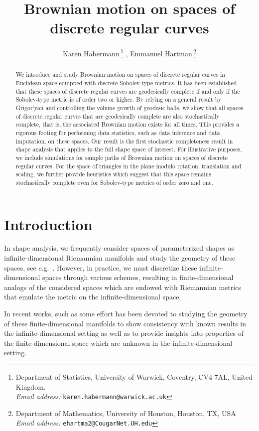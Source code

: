 \documentclass[11pt]{article}
\title{Brownian motion on spaces of discrete regular curves\blfootnote{{\it $2020$ Mathematics Subject Classification.} 58J65, 60J65, 62R30}\blfootnote{{\it Key words and phrases.} shape analysis, Sobolev metrics, Brownian motion, stochastic completeness, numerics}}
\author{Karen Habermann\,\footnote{Department of Statistics, University of Warwick, Coventry, CV4 7AL, United Kingdom.\\ {\it Email address:} {\tt karen.habermann@warwick.ac.uk}} , Emmanuel Hartman\,\footnote{Department of Mathematics, University of Houston, Houston, TX, USA\\ {\it Email address:} {\tt ehartma2@CougarNet.UH.edu}}}
\begin{document}
\maketitle
\begin{abstract}
We introduce and study Brownian motion on spaces of discrete regular curves in Euclidean space equipped with discrete Sobolev-type metrics. It has been established that these spaces of discrete regular curves are geodesically complete if and only if the Sobolev-type metric is of order two or higher. By relying on a general result by Grigor'yan and controlling the volume growth of geodesic balls, we show that all spaces of discrete regular curves that are geodesically complete are also stochastically complete, that is, the associated Brownian motion exists for all times. This provides a rigorous footing for performing data statistics, such as data inference and data imputation, on these spaces. Our result is the first stochastic completeness result in shape analysis that applies to the full shape space of interest. For illustrative purposes, we include simulations for sample paths of Brownian motion on spaces of discrete regular curves. For the space of triangles in the plane modulo rotation, translation and scaling, we further provide heuristics which suggest that this space remains stochastically complete even for Sobolev-type metrics of order zero and one.
\end{abstract}

\section{Introduction}
In shape analysis, we frequently consider spaces of parameterized shapes as infinite-dimensional Riemannian manifolds and study the geometry of these spaces, see e.g.~\cite{BMM23,bruveris2015completeness,bruveris2014geodesic,MM06,michor2007overview}. However, in practice, we must discretize these infinite-dimensional spaces through various schemes, resulting in finite-dimensional analogs of the considered spaces which are endowed with Riemannian metrics that emulate the metric on the infinite-dimensional space.

In recent works, such as \cite{beutler2025discretegeodesiccalculusspace,cerqueira2024sobolevmetricsspacesdiscrete} some effort has been devoted to studying the geometry of these finite-dimensional manifolds to show consistency with known results in the infinite-dimensional setting as well as to provide insights into properties of the finite-dimensional space which are unknown in the infinite-dimensional setting.
\end{document}

